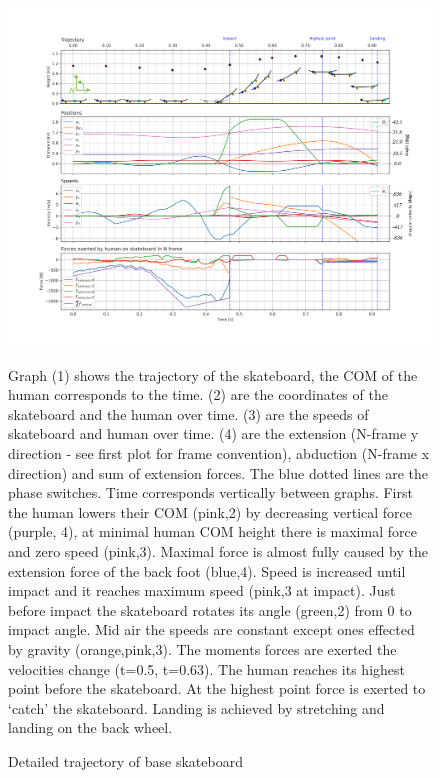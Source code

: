 \documentclass[default,iicol]{sn-jnl}
\begin{document}
\begin{figure}
    \includegraphics[trim={0cm 0cm 0cm 0cm},clip,width=\textwidth]{figure/Results/data_basedpi600.png}
    \vspace{-1.5cm}\caption[Trajectory, positions, speeds, and forces of base optimization]{
    Detailed trajectory of base skateboard}\label{f_noparameter}
    Graph (1) shows the trajectory of the skateboard, the COM of the human corresponds to the time. (2) are the coordinates of the skateboard and the human over time. (3) are the speeds of skateboard and human over time. (4) are the extension (N-frame y direction - see first plot for frame convention), abduction (N-frame x direction) and sum of extension forces. The blue dotted lines are the phase switches. Time corresponds vertically between graphs. First the human lowers their COM (pink,2) by decreasing vertical force (purple, 4), at minimal human COM height there is maximal force and zero speed (pink,3). Maximal force is almost fully caused by the extension force of the back foot (blue,4). Speed is increased until impact and it reaches maximum speed (pink,3 at impact). Just before impact the skateboard rotates its angle (green,2) from 0 to impact angle. Mid air the speeds are constant except ones effected by gravity (orange,pink,3). The moments forces are exerted the velocities change (t=0.5, t=0.63). The human reaches its highest point before the skateboard. At the highest point force is exerted to `catch' the skateboard. Landing is achieved by stretching and landing on the back wheel.
    
\end{figure}
\end{document}
